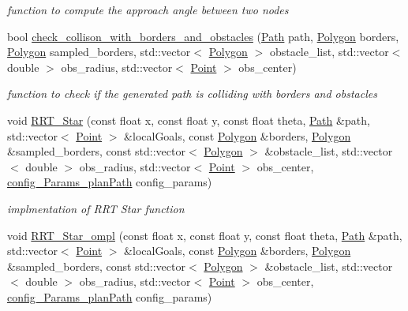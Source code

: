 \begin{DoxyCompactItemize}
\begin{DoxyCompactList}\small\item\em function to compute the approach angle between two nodes \end{DoxyCompactList}\item 
bool \hyperlink{namespacestudent_a7e23765e95f85572437c4f8bc2bc6d6e}{check\+\_\+collison\+\_\+with\+\_\+borders\+\_\+and\+\_\+obstacles} (\hyperlink{structPath}{Path} path, \hyperlink{utils_8hpp_a18281038c49470960bd8f4d15b893441}{Polygon} borders, \hyperlink{utils_8hpp_a18281038c49470960bd8f4d15b893441}{Polygon} sampled\+\_\+borders, std\+::vector$<$ \hyperlink{utils_8hpp_a18281038c49470960bd8f4d15b893441}{Polygon} $>$ obstacle\+\_\+list, std\+::vector$<$ double $>$ obs\+\_\+radius, std\+::vector$<$ \hyperlink{structPoint}{Point} $>$ obs\+\_\+center)
\begin{DoxyCompactList}\small\item\em function to check if the generated path is colliding with borders and obstacles \end{DoxyCompactList}\item 
void \hyperlink{namespacestudent_ae985c265d91c51e3afdc782c70964ecd}{R\+R\+T\+\_\+\+Star} (const float x, const float y, const float theta, \hyperlink{structPath}{Path} \&path, std\+::vector$<$ \hyperlink{structPoint}{Point} $>$ \&local\+Goals, const \hyperlink{utils_8hpp_a18281038c49470960bd8f4d15b893441}{Polygon} \&borders, \hyperlink{utils_8hpp_a18281038c49470960bd8f4d15b893441}{Polygon} \&sampled\+\_\+borders, const std\+::vector$<$ \hyperlink{utils_8hpp_a18281038c49470960bd8f4d15b893441}{Polygon} $>$ \&obstacle\+\_\+list, std\+::vector$<$ double $>$ obs\+\_\+radius, std\+::vector$<$ \hyperlink{structPoint}{Point} $>$ obs\+\_\+center, \hyperlink{classconfig__Params__planPath}{config\+\_\+\+Params\+\_\+plan\+Path} config\+\_\+params)
\begin{DoxyCompactList}\small\item\em implmentation of R\+RT Star function \end{DoxyCompactList}\item 
void \hyperlink{namespacestudent_ab8f6c07df2df619bef2b28d6f7ebcac7}{R\+R\+T\+\_\+\+Star\+\_\+ompl} (const float x, const float y, const float theta, \hyperlink{structPath}{Path} \&path, std\+::vector$<$ \hyperlink{structPoint}{Point} $>$ \&local\+Goals, const \hyperlink{utils_8hpp_a18281038c49470960bd8f4d15b893441}{Polygon} \&borders, \hyperlink{utils_8hpp_a18281038c49470960bd8f4d15b893441}{Polygon} \&sampled\+\_\+borders, const std\+::vector$<$ \hyperlink{utils_8hpp_a18281038c49470960bd8f4d15b893441}{Polygon} $>$ \&obstacle\+\_\+list, std\+::vector$<$ double $>$ obs\+\_\+radius, std\+::vector$<$ \hyperlink{structPoint}{Point} $>$ obs\+\_\+center, \hyperlink{classconfig__Params__planPath}{config\+\_\+\+Params\+\_\+plan\+Path} config\+\_\+params)

\end{DoxyCompactItemize}
